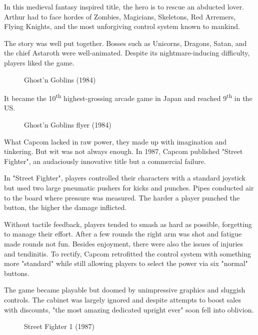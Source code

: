 In this medieval fantasy inspired title, the hero is to rescue an abducted lover. Arthur had to face hordes of Zombies, Magicians, Skeletons, Red Arremers, Flying Knights, and the most unforgiving control system known to mankind.

The story was well put together. Bosses such as Unicorns, Dragons, Satan, and the chief Astaroth were well-animated. Despite its nightmare-inducing difficulty, players liked the game.

\vfill 

\begin{figure}[H]
\caption*{Ghost’n Goblins (1984)}
\end{figure}
\pagebreak

It became the 10\textsuperscript{th} highest-grossing arcade game in Japan and reached 9\textsuperscript{th} in the US.
\vfill 
\begin{figure}[H]
\caption*{Ghost’n Goblins flyer (1984)}
\end{figure}
\pagebreak

What Capcom lacked in raw power, they made up with imagination and tinkering. But wit was not always enough. In 1987, Capcom published "Street Fighter", an audaciously innovative title but a commercial failure.

In "Street Fighter", players controlled their characters with a standard joystick but used two large pneumatic pushers for kicks and punches. Pipes conducted air to the board where pressure was measured. The harder a player punched the button, the higher the damage inflicted.

Without tactile feedback, players tended to smash as hard as possible, forgetting to manage their effort. After a few rounds the right arm was shot and fatigue made rounds not fun. Besides enjoyment, there were also the issues of injuries and tendinitis. To rectify, Capcom retrofitted the control system with something more "standard" while still allowing players to select the power via six "normal" buttons. 

The game became playable but doomed by unimpressive graphics and sluggish controls. The cabinet was largely ignored and despite attempts to boost sales with discounts, "the most amazing dedicated upright ever" soon fell into oblivion.


\begin{figure}[H]
\caption*{Street Fighter 1 (1987)}
\end{figure}


